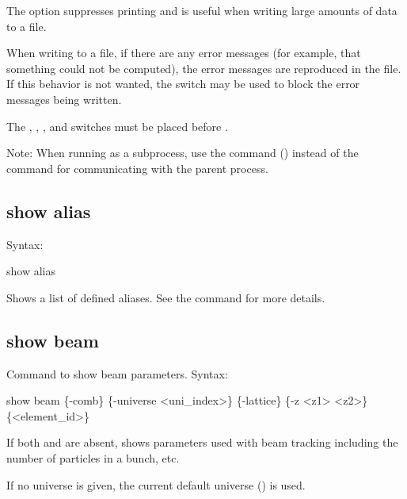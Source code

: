 {{{{{{{{The  option suppresses printing and is useful when writing large amounts of data to a
file.

When writing to a file, if there are any error messages (for example, that something could not be
computed), the error messages are reproduced in the file. If this behavior is not wanted, the
 switch may be used to block the error messages being written.

The , , , and  switches must be placed before
.

Note: When running \tao as a subprocess, use the  command ()
instead of the  command for communicating with the parent process.



\subsection{show alias}
\label{s:show.alias}

Syntax:
\begin{example}
  show alias
\end{example}

Shows a list of defined aliases. See the  command for more details.


\subsection{show beam}
\label{s:show.beam}

Command to show beam parameters. Syntax:
\begin{example}
  show beam \{-comb\} \{-universe <uni_index>\} \{-lattice\} \{-z <z1> <z2>\} \{<element_id>\}
\end{example}

If both  and  are absent,  shows parameters
used with beam tracking including the number of particles in a bunch, etc.

If no universe is given, the current default universe () is used.

}}}}}}}}
